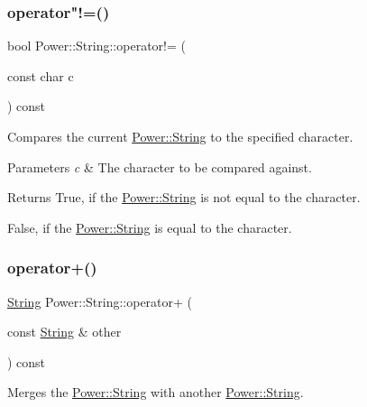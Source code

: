 \subsubsection{\texorpdfstring{operator"!=()}{operator!=()}\hspace{0.1cm}{\footnotesize\ttfamily [3/3]}}
{\footnotesize\ttfamily bool Power\+::\+String\+::operator!= (\begin{DoxyParamCaption}\item[{const char}]{c }\end{DoxyParamCaption}) const\hspace{0.3cm}{\ttfamily [inline]}}



Compares the current \hyperlink{class_power_1_1_string}{Power\+::\+String} to the specified character. 


\begin{DoxyParams}{Parameters}
{\em c} & The character to be compared against. \\
\hline
\end{DoxyParams}
\begin{DoxyReturn}{Returns}
True, if the \hyperlink{class_power_1_1_string}{Power\+::\+String} is not equal to the character. 

False, if the \hyperlink{class_power_1_1_string}{Power\+::\+String} is equal to the character. 
\end{DoxyReturn}
\mbox{\label{class_power_1_1_string_a570430069e83e0421ccdfb3cddc8a899}} 
\subsubsection{\texorpdfstring{operator+()}{operator+()}\hspace{0.1cm}{\footnotesize\ttfamily [1/11]}}
{\footnotesize\ttfamily \hyperlink{class_power_1_1_string}{String} Power\+::\+String\+::operator+ (\begin{DoxyParamCaption}\item[{const \hyperlink{class_power_1_1_string}{String} \&}]{other }\end{DoxyParamCaption}) const\hspace{0.3cm}{\ttfamily [inline]}}



Merges the \hyperlink{class_power_1_1_string}{Power\+::\+String} with another \hyperlink{class_power_1_1_string}{Power\+::\+String}. 


